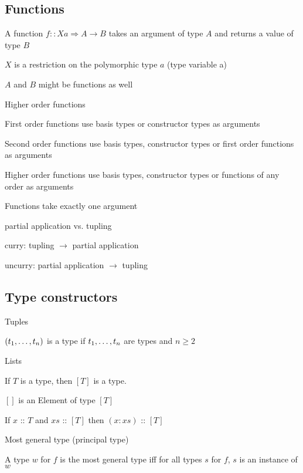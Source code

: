 \subsection{Functions}
\enumstart
	\item A function $f :: X a \Rightarrow A \rightarrow B$ takes an argument of type $A$ and returns a value of type $B$
	\item $X$ is a restriction on the polymorphic type $a$ (type variable a)
	\item $A$ and $B$ might be functions as well
	\item Higher order functions
	\enumstart
		\item First order functions use basis types or constructor types as arguments
		\item Second order functions use basis types, constructor types or first order functions as arguments
		\item Higher order functions use basis types, constructor types or functions of any order as arguments
	\enumend
	\item Functions take exactly one argument
	\enumstart
		\item partial application vs. tupling
		\item curry: tupling $\rightarrow$ partial application
		\item uncurry: partial application $\rightarrow$ tupling
	\enumend
\enumend

\subsection{Type constructors}
\enumstart
	\item Tuples
	\enumstart
		\item $(t_1, \mathellipsis, t_n)$ is a type if $t_1, \mathellipsis, t_n$ are types and $n \ge 2$
	\enumend
	\item Lists
	\enumstart
		\item If $T$ is a type, then $[T]$ is a type.
		\item $[]$ is an Element of type $[T]$
		\item If $x$ :: $T$ and $xs$ :: $[T]$ then $(x:xs)$ :: $[T]$
	\enumend
	\item Most general type (principal type)
	\enumstart
		\item A type $w$ for $f$ is the most general type iff for all types $s$ for $f$, $s$ is an instance of $w$
	\enumend
\enumend
